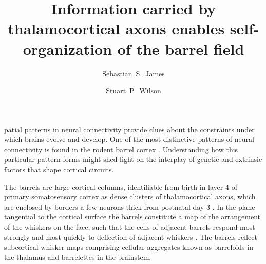 \documentclass[9pt,twocolumn,twoside,lineno]{pnas-new}
\title{Information carried by thalamocortical axons enables self-organization of the barrel field}
\author[a,1]{Sebastian~S.~James}
\author[a]{Stuart~P.~Wilson}
\affil[a]{Department of Psychology, The University of Sheffield, Sheffield, United Kingdom.}
\begin{document}
\newcommand{\cmnt}[1]{\textcolor{blue}{#1}}
\newcommand{\dvrg}{\nabla\vcdot\nabla}
\newcommand{\e}{\emph}
\newcommand{\bol}{\textbf}
\newcommand{\mb}[1]{\mathbf{#1}}
\makeatletter
\newcommand*\vcdot{\mathpalette\vcdot@{.35}}
\newcommand*\vcdot@[2]{\mathbin{\vcenter{\hbox{\scalebox{#2}{$\m@th#1\bullet$}}}}}
\makeatother

\maketitle
\thispagestyle{firststyle}

\modulolinenumbers{}
\linenumbers

patial patterns in neural connectivity provide clues about the
constraints under which brains evolve and develop.
One of the most
distinctive patterns of neural connectivity is found in the rodent
barrel cortex \cite{woolsey_structural_1970}.
Understanding how this particular pattern forms might shed light on the
interplay of genetic and extrinsic factors that shape cortical circuits.

The barrels are large cortical columns, identifiable from birth in layer 4 of
primary somatosensory cortex as dense clusters of thalamocortical axons, which
are enclosed by borders a few neurons thick from postnatal day 3
\citep{erzurumlu_development_2012}. In the plane tangential to the cortical
surface the barrels constitute a map of the arrangement of the whiskers on the
face,
such that the cells of adjacent barrels respond most strongly and most quickly
to deflection of adjacent whiskers \citep{armstrong-james_flow_1992}. The
barrels reflect subcortical whisker maps comprising cellular aggregates known
as barreloids in the thalamus \cite{van_der_loos_barreloids_1976} and
barrelettes in the brainstem.
\end{document}
